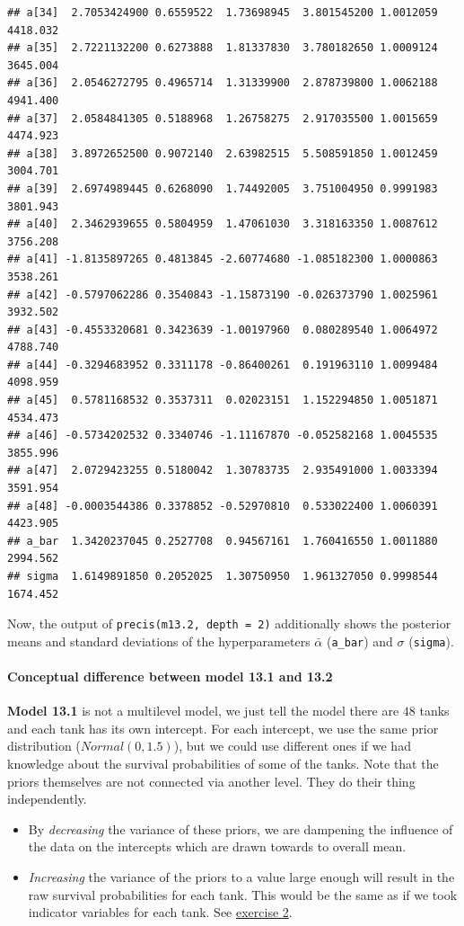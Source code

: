 \documentclass[
]{article}
\begin{document}
\begin{verbatim}
## a[34]  2.7053424900 0.6559522  1.73698945  3.801545200 1.0012059 4418.032
## a[35]  2.7221132200 0.6273888  1.81337830  3.780182650 1.0009124 3645.004
## a[36]  2.0546272795 0.4965714  1.31339900  2.878739800 1.0062188 4941.400
## a[37]  2.0584841305 0.5188968  1.26758275  2.917035500 1.0015659 4474.923
## a[38]  3.8972652500 0.9072140  2.63982515  5.508591850 1.0012459 3004.701
## a[39]  2.6974989445 0.6268090  1.74492005  3.751004950 0.9991983 3801.943
## a[40]  2.3462939655 0.5804959  1.47061030  3.318163350 1.0087612 3756.208
## a[41] -1.8135897265 0.4813845 -2.60774680 -1.085182300 1.0000863 3538.261
## a[42] -0.5797062286 0.3540843 -1.15873190 -0.026373790 1.0025961 3932.502
## a[43] -0.4553320681 0.3423639 -1.00197960  0.080289540 1.0064972 4788.740
## a[44] -0.3294683952 0.3311178 -0.86400261  0.191963110 1.0099484 4098.959
## a[45]  0.5781168532 0.3537311  0.02023151  1.152294850 1.0051871 4534.473
## a[46] -0.5734202532 0.3340746 -1.11167870 -0.052582168 1.0045535 3855.996
## a[47]  2.0729423255 0.5180042  1.30783735  2.935491000 1.0033394 3591.954
## a[48] -0.0003544386 0.3378852 -0.52970810  0.533022400 1.0060391 4423.905
## a_bar  1.3420237045 0.2527708  0.94567161  1.760416550 1.0011880 2994.562
## sigma  1.6149891850 0.2052025  1.30750950  1.961327050 0.9998544 1674.452
\end{verbatim}

Now, the output of \texttt{precis(m13.2,\ depth\ =\ 2)} additionally
shows the posterior means and standard deviations of the hyperparameters
\(\bar{\alpha}\) (\texttt{a\_bar}) and \(\sigma\) (\texttt{sigma}).

\paragraph{Conceptual difference between model 13.1 and
13.2}\label{conceptual-difference-between-model-13.1-and-13.2}

\textbf{Model 13.1} is not a multilevel model, we just tell the model
there are \(48\) tanks and each tank has its own intercept. For each
intercept, we use the same prior distribution (\(Normal (0, 1.5)\)), but
we could use different ones if we had knowledge about the survival
probabilities of some of the tanks. Note that the priors themselves are
not connected via another level. They do their thing independently.

\begin{itemize}
\item
  By \emph{decreasing} the variance of these priors, we are dampening
  the influence of the data on the intercepts which are drawn towards to
  overall mean.
\item
  \emph{Increasing} the variance of the priors to a value large enough
  will result in the raw survival probabilities for each tank. This
  would be the same as if we took indicator variables for each tank. See
  \hyperref[exercise2_LMM]{exercise 2}.
\end{itemize}
\end{document}
